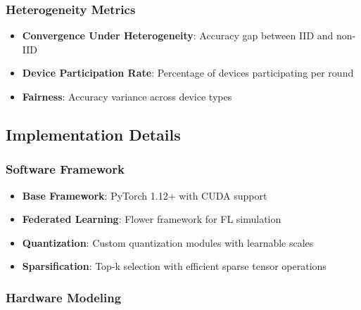 \documentclass[journal]{IEEEtran}
\begin{document}
\subsubsection{Heterogeneity Metrics}

\begin{itemize}
    \item \textbf{Convergence Under Heterogeneity}: Accuracy gap between IID and non-IID
    \item \textbf{Device Participation Rate}: Percentage of devices participating per round
    \item \textbf{Fairness}: Accuracy variance across device types
\end{itemize}

\subsection{Implementation Details}

\subsubsection{Software Framework}

\begin{itemize}
    \item \textbf{Base Framework}: PyTorch 1.12+ with CUDA support
    \item \textbf{Federated Learning}: Flower framework \cite{beutel2020flower} for FL simulation
    \item \textbf{Quantization}: Custom quantization modules with learnable scales
    \item \textbf{Sparsification}: Top-k selection with efficient sparse tensor operations
\end{itemize}

\subsubsection{Hardware Modeling}
\end{document}

